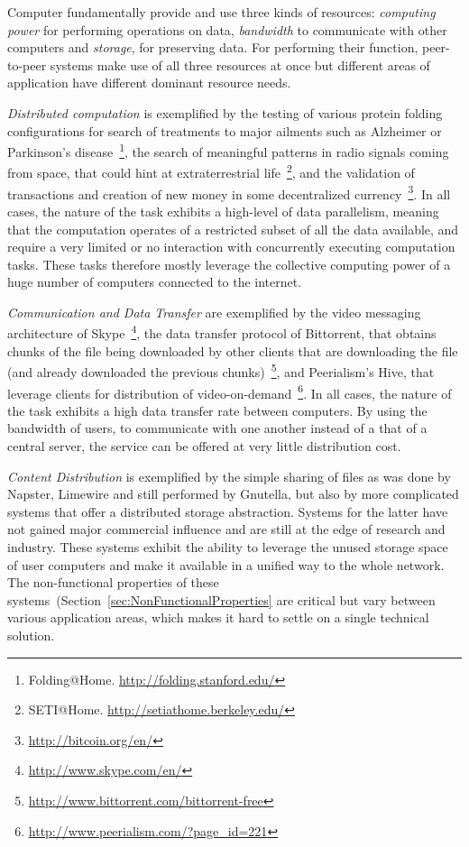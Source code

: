 Computer fundamentally provide and use three kinds of resources: \textit{computing power} for performing operations on data, \textit{bandwidth} to communicate with other computers and \textit{storage}, for preserving data. For performing their function, peer-to-peer systems make use of all three resources at once but different areas of application have different dominant resource needs.

\textit{Distributed computation} is exemplified by the testing of various protein folding configurations for search of treatments to major ailments such as Alzheimer or Parkinson's disease~\footnote{Folding@Home. \url{http://folding.stanford.edu/}}, the search of meaningful patterns in radio signals coming from space, that could hint at extraterrestrial life~\footnote{SETI@Home. \url{http://setiathome.berkeley.edu/}}, and the validation of transactions and creation of new money in some decentralized currency~\footnote{\url{http://bitcoin.org/en/}}. In all cases, the nature of the task exhibits a high-level of data parallelism, meaning that the computation operates of a restricted subset of all the data available, and require a very limited or no interaction with concurrently executing computation tasks. These tasks therefore mostly leverage the collective computing power of a huge number of computers connected to the internet.

\textit{Communication and Data Transfer} are exemplified by the video messaging architecture of Skype~\footnote{\url{http://www.skype.com/en/}}, the data transfer protocol of Bittorrent, that obtains chunks of the file being downloaded by other clients that are downloading the file (and already downloaded the previous chunks)~\footnote{\url{http://www.bittorrent.com/bittorrent-free}}, and Peerialism's Hive, that leverage clients for distribution of video-on-demand~\footnote{\url{http://www.peerialism.com/?page_id=221}}. In all cases, the nature of the task exhibits a high data transfer rate between computers. By using the bandwidth of users, to communicate with one another instead of a that of a central server, the service can be offered at very little distribution cost.

\textit{Content Distribution} is exemplified by the simple sharing of files as was done by Napster, Limewire and still performed by Gnutella, but also by more complicated systems that offer a distributed storage abstraction. Systems for the latter have not gained major commercial influence and are still at the edge of research and industry. These systems exhibit the ability to leverage the unused storage space of user computers and make it available in a unified way to the whole network. The non-functional properties of these systems~(Section~\ref{sec:NonFunctionalProperties} are critical but vary between various application areas, which makes it hard to settle on a single technical solution.  

